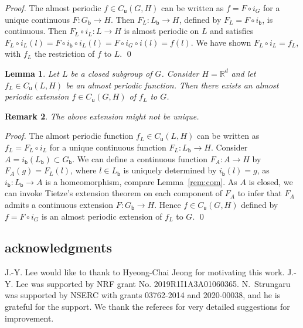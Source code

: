 \documentclass[11pt, a4wide]{amsart}
\newtheorem{lemma}{Lemma}
\newtheorem{remark}[lemma]{Remark}
\numberwithin{lemma}{section}
\begin{document}
\begin{appendix}
\begin{proof}
The almost periodic $f\in C_\mathsf{u}(G,H)$ can be written as $f=F\circ i_G$ for a unique continuous $F:G_\mathsf{b}\to H$. Then $F_L: L_\mathsf{b}\to H$, defined by $F_L=F\circ i_\mathsf{b}$, is continuous. Then $F_L\circ i_L: L\to H$ is almost periodic on $L$ and satisfies $F_L \circ i_L(l)= F\circ i_\mathsf{b}\circ i_L(l)= F\circ i_G\circ i (l)=f(l)$. We have shown $F_L\circ i_L=f_L$, with $f_L$ the restriction of $f$ to $L$.
\qed
\end{proof}

\begin{lemma}\label{almost-periodic-on-L-is-on-G}
Let $L$ be a closed subgroup of $G$. Consider $H=\mathbb R^d$ and let $f_L\in C_\mathsf{u}(L,H)$ be an almost periodic function. Then there exists an almost periodic extension $f\in C_\mathsf{u}(G,H)$ of $f_L$ to $G$.
\end{lemma}

\begin{remark}
The above extension might not be unique.
\end{remark}

\begin{proof}
The almost periodic function $f_L\in C_\mathsf{u}(L,H)$ can be written as $f_L=F_L\circ i_L$ for a unique continuous function $F_L:L_\mathsf{b}\to H$. Consider $A=i_\mathsf{b}(L_\mathsf{b})\subset G_\mathsf{b}$. We can define a continuous function $F_A: A\to H$ by $F_A(g)=F_L(l)$, where $l\in L_\mathsf{b}$ is uniquely determined by $i_\mathsf{b}(l)=g$, as $i_\mathsf{b}: L_\mathsf{b}\to A$ is a homeomorphism, compare Lemma~\ref{rem:com}. As $A$ is closed, we can invoke Tietze's extension theorem \cite[Thm.~A.8.3]{DE} on each component of $F_A$  to infer that $F_A$ admits a continuous extension $F: G_\mathsf{b}\to H$. Hence $f\in C_\mathsf{u}(G,H)$ defined by $f=F\circ i_G$ is an almost periodic extension of $f_L$ to $G$.
\qed
\end{proof}



\end{appendix}


\subsection*{acknowledgments}
J.-Y. Lee would like to thank to Hyeong-Chai Jeong for motivating this work. J.-Y. Lee was supported by NRF grant No. 2019R1I1A3A01060365.
N.~Strungaru was supported by NSERC with grants 03762-2014 and 2020-00038, and he is grateful for the support. We thank the referees for very detailed suggestions for improvement.
\end{document}
